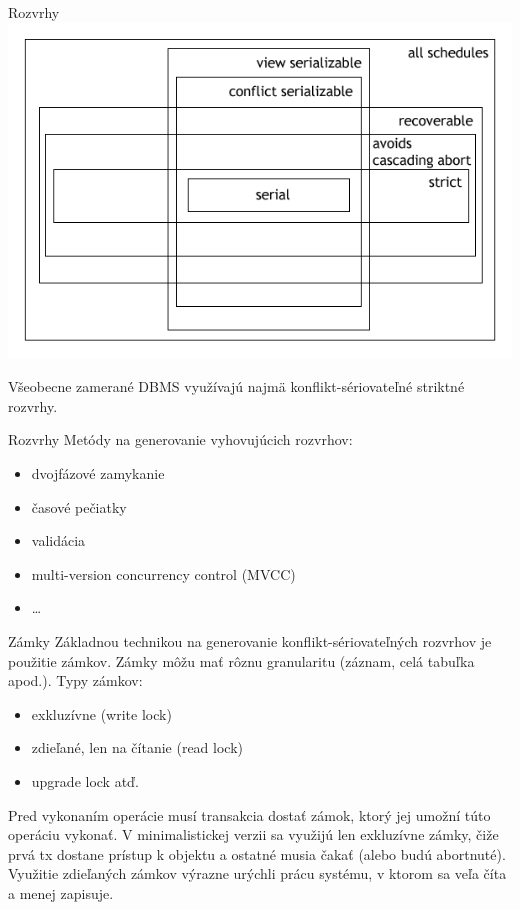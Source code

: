 \documentclass[12pt]{beamer}
\begin{document}
\begin{frame}[fragile]{Rozvrhy}
\includegraphics[scale=2]{rozvrhy.png}

Všeobecne zamerané DBMS využívajú najmä konflikt-sériovateľné striktné rozvrhy.
\end{frame}

\begin{frame}[fragile]{Rozvrhy}
Metódy na generovanie vyhovujúcich rozvrhov:
\begin{itemize}
\item dvojfázové zamykanie
\item časové pečiatky
\item validácia
\item multi-version concurrency control (MVCC)
\item \dots
\end{itemize}
\end{frame}

\begin{frame}[fragile]{Zámky}
Základnou technikou na generovanie konflikt-sériovateľných rozvrhov je použitie zámkov.
\alert{Zámky} môžu mať rôznu granularitu (záznam, celá tabuľka apod.). Typy zámkov:
\begin{itemize}
\item exkluzívne (write lock)
\item zdieľané, len na čítanie (read lock)
\item upgrade lock atď.
\end{itemize}
Pred vykonaním operácie musí transakcia dostať zámok, ktorý jej umožní túto operáciu vykonať.
V minimalistickej verzii sa využijú len exkluzívne zámky, čiže prvá tx dostane prístup k objektu
a ostatné musia čakať (alebo budú abortnuté). Využitie zdieľaných zámkov výrazne urýchli prácu systému,
v ktorom sa veľa číta a menej zapisuje.
\end{frame}
\end{document}
